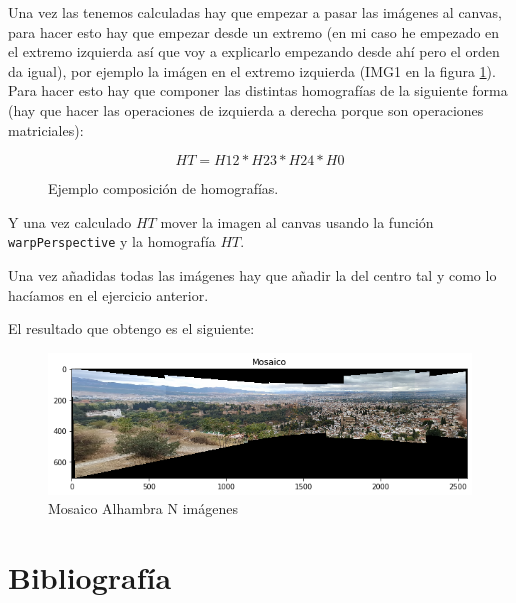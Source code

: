 \documentclass[12pt,spanish]{article}
\begin{document}
Una vez las tenemos calculadas hay que empezar a pasar las imágenes al canvas, para hacer esto hay que empezar desde un extremo (en mi caso he empezado en el extremo izquierda así que voy a explicarlo empezando desde ahí pero el orden da igual), por ejemplo la imágen en el extremo izquierda (IMG1 en la figura \ref{calculo_homografias_ej}). Para hacer esto hay que componer las distintas homografías de la siguiente forma (hay que hacer las operaciones de izquierda a derecha porque son operaciones matriciales):

\begin{figure}[H]
	\centering
	\[HT = H12 * H23 * H24 * H0 \]
	\caption{Ejemplo composición de homografías.}
	\label{calculo_homografias_ej}
\end{figure}

Y una vez calculado $HT$ mover la imagen al canvas usando la función \texttt{warpPerspective} y la homografía $HT$.

Una vez añadidas todas las imágenes hay que añadir la del centro tal y como lo hacíamos en el ejercicio anterior.

El resultado que obtengo es el siguiente: 

\begin{figure}[H]
	\centering
	\includegraphics[width=12cm]{./imagenes_memoria/mosaicoN.png}
	\caption{Mosaico Alhambra N imágenes}
	\label{mosaicoN}
\end{figure}

\newpage

\section{Bibliografía}
\end{document}
